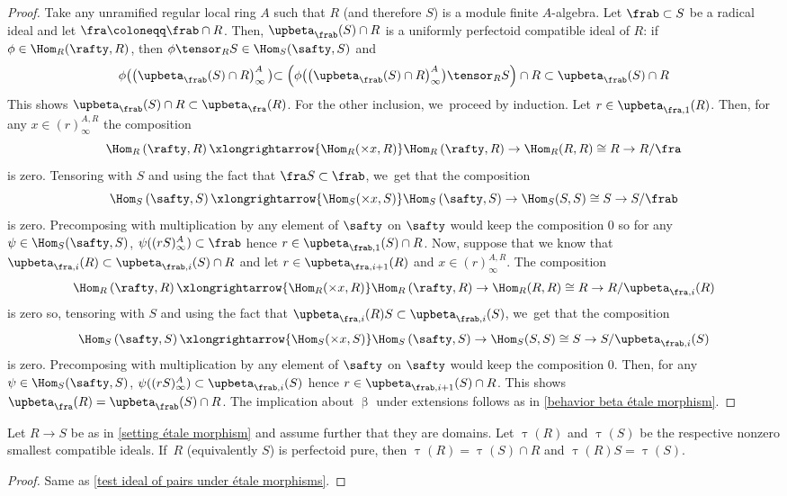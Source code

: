 \begin{proof}
Take any unramified regular local ring $A$ such that $R$ (and therefore $S$) is a module finite $A$-algebra. Let $\frab\subset S$ be a radical ideal and let $\fra\coloneqq \frab\cap R$. Then, $\upbeta_\frab(S) \cap R$ is a uniformly perfectoid compatible ideal of $R$: if $\phi\in \Hom_R(\rafty,R)$, then $\phi\tensor_R S\in \Hom_S(\safty,S)$ and\vspace*{-3pt}
\[
\phi\bigl(\left(\upbeta_\frab(S)\cap R\right)^A_\infty\bigl)\subset \left(\phi\bigl(\left(\upbeta_\frab(S)\cap R\right)^A_\infty\bigr)\tensor_R S\right)\cap R \subset \upbeta_\frab(S)\cap R
\]
This shows $\upbeta_\frab(S)\cap R\subset \upbeta_\fra(R)$. For the other inclusion, we~proceed by induction. Let $r\in \upbeta_{\fra,1}(R)$. Then, for any $x\in (r)^{A, R}_\infty$ the composition\vspace*{-3pt}
\[
\Hom_R\left(\rafty,R\right)\xlongrightarrow{\Hom_R(\times x, R)}\Hom_R\left(\rafty,R\right) \to \Hom_R(R,R)\cong R \to R/\fra
\]
is zero. Tensoring with $S$ and using the fact that $\fra S\subset \frab$, we~get that the composition\vspace*{-3pt}
\[
\Hom_S\left(\safty,S\right)\xlongrightarrow{\Hom_S(\times x, S)}\Hom_S\left(\safty,S\right) \to \Hom_S(S,S)\cong S \to S/\frab
\]
is zero. Precomposing with multiplication by any element of $\safty$ on $\safty$ would keep the composition $0$ so for any $\psi\in \Hom_S(\safty,S)$, $\psi((rS)^A_\infty)\subset \frab$ hence $r\in \upbeta_{\frab,1} (S) \cap R$. Now, suppose that we know that $\upbeta_{\fra,i}(R)\subset \upbeta_{\frab,i} (S)\cap R$ and let $r\in \upbeta_{\fra,i+1}(R)$ and $x \in (r)^{A,R}_\infty$.
The composition\vspace*{-3pt}
\[
\Hom_R\left(\rafty,R\right)\xlongrightarrow{\Hom_R(\times x, R)}\Hom_R\left(\rafty,R\right) \to \Hom_R(R,R)\cong R \to R/\upbeta_{\fra,i}(R)
\]
is zero so, tensoring with $S$ and using the fact that $\upbeta_{\fra,i}(R) S\subset \upbeta_{\frab,i}(S)$, we~get that the composition\vspace*{-3pt}
\[
\Hom_S\left(\safty,S\right)\xlongrightarrow{\Hom_S(\times x, S)}\Hom_S\left(\safty,S\right) \to \Hom_S(S,S)\cong S \to S/\upbeta_{\frab,i}(S)
\]
is zero. Precomposing with multiplication by any element of $\safty$ on $\safty$ would keep the composition $0$. Then, for any $\psi\in \Hom_S(\safty,S)$, $\psi((rS)^A_\infty)\subset \upbeta_{\frab,i}(S)$ hence $r\in \upbeta_{\frab,i+1} (S) \cap R$. This shows $\upbeta_\fra(R)=\upbeta_\frab(S)\cap R$.
The implication about $\upbeta$ under extensions follows as in \autoref{behavior beta étale morphism}.
\end{proof}

\begin{corollary}
Let $R\to S$ be as in \autoref{setting étale morphism} and assume further that they are domains. Let $\uptau(R)$ and $\uptau(S)$ be the respective nonzero smallest compatible ideals. If~$R$ (equivalently $S$) is perfectoid pure, then $\uptau(R)=\uptau(S)\cap R$ and $\uptau(R) S=\uptau(S)$.
\end{corollary}

\begin{proof}
Same as \autoref{test ideal of pairs under étale morphisms}.
\end{proof}
